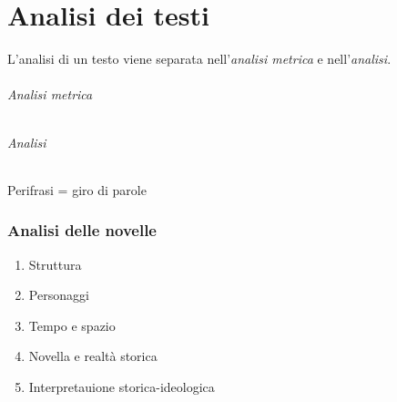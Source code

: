 \documentclass[a4paper]{article}
\begin{document}
\pagebreak

\part{Analisi dei testi}


L'analisi di un testo viene separata nell'\textit{analisi metrica} e nell'\textit{analisi}.

\paragraph{Analisi metrica}

\phantom{ }\vspace{0.1cm}

\paragraph{Analisi}

Perifrasi = giro di parole

\section{Analisi delle novelle}

\begin{enumerate}
    \item Struttura
    \item Personaggi
    \item Tempo e spazio
    \item Novella e realtà storica
    \item Interpretauione storica-ideologica
\end{enumerate}
\end{document}
